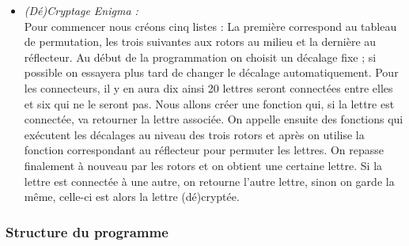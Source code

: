 \documentclass[a4paper,12pt,abstracton,titlepage]{scrartcl}
\begin{document}
{\begin{itemize}
\item \textit{(Dé)Cryptage Enigma :}\\
Pour commencer nous créons cinq listes : La première correspond au tableau de permutation, les trois suivantes aux rotors au milieu et la dernière au réflecteur. Au début de la programmation on choisit un décalage fixe ; si possible on essayera plus tard de changer le décalage automatiquement.
Pour les connecteurs, il y en aura dix ainsi 20 lettres seront connectées entre elles et six qui ne le seront pas. Nous allons créer une fonction qui, si la lettre est connectée, va retourner la lettre associée.
On appelle ensuite des fonctions qui exécutent les décalages au niveau des trois rotors et après on utilise la fonction correspondant au réflecteur pour permuter les lettres. On repasse finalement à nouveau par les rotors et on obtient une certaine lettre. Si la lettre est connectée à une autre, on retourne l’autre lettre, sinon on garde la même, celle-ci est alors la lettre (dé)cryptée.\\
\end{itemize}

\newpage
\subsubsection{Structure du programme}

}
\end{document}
